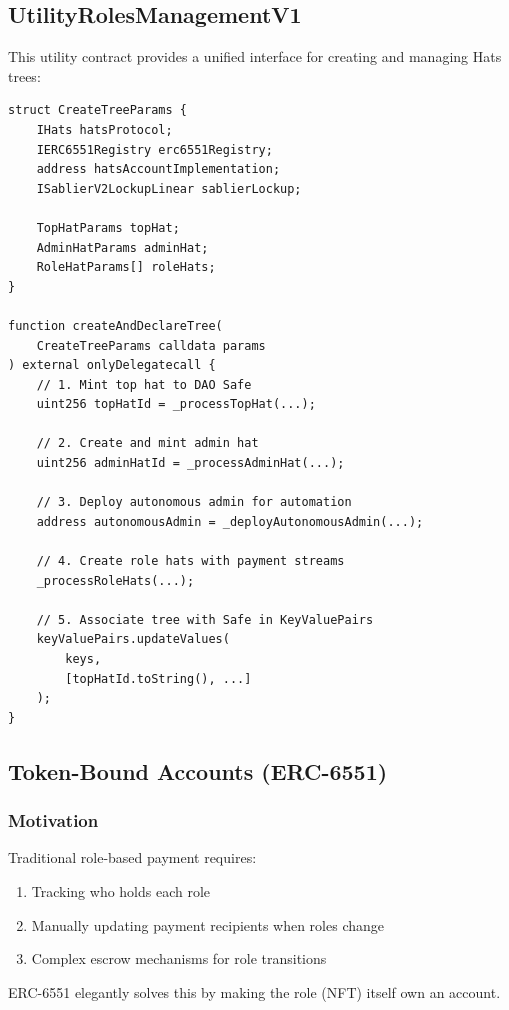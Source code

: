\subsection{UtilityRolesManagementV1}

This utility contract provides a unified interface for creating and managing Hats trees:

\begin{lstlisting}[caption=Creating a Hats Tree]
struct CreateTreeParams {
    IHats hatsProtocol;
    IERC6551Registry erc6551Registry;
    address hatsAccountImplementation;
    ISablierV2LockupLinear sablierLockup;

    TopHatParams topHat;
    AdminHatParams adminHat;
    RoleHatParams[] roleHats;
}

function createAndDeclareTree(
    CreateTreeParams calldata params
) external onlyDelegatecall {
    // 1. Mint top hat to DAO Safe
    uint256 topHatId = _processTopHat(...);

    // 2. Create and mint admin hat
    uint256 adminHatId = _processAdminHat(...);

    // 3. Deploy autonomous admin for automation
    address autonomousAdmin = _deployAutonomousAdmin(...);

    // 4. Create role hats with payment streams
    _processRoleHats(...);

    // 5. Associate tree with Safe in KeyValuePairs
    keyValuePairs.updateValues(
        keys,
        [topHatId.toString(), ...]
    );
}
\end{lstlisting}

\subsection{Token-Bound Accounts (ERC-6551)}

\subsubsection{Motivation}

Traditional role-based payment requires:
\begin{enumerate}
    \item Tracking who holds each role
    \item Manually updating payment recipients when roles change
    \item Complex escrow mechanisms for role transitions
\end{enumerate}

ERC-6551 elegantly solves this by making the role (NFT) itself own an account.

